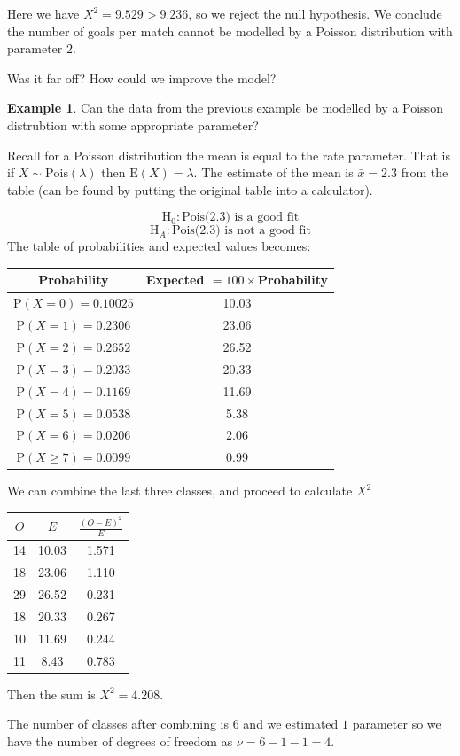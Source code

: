 \documentclass[
]{book}
\theoremstyle{definition}
\theoremstyle{definition}
\newtheorem{example}{Example}[chapter]
\theoremstyle{definition}
\theoremstyle{definition}
\theoremstyle{remark}
\begin{document}
Here we have \(X^2 = 9.529 > 9.236\), so we reject the null hypothesis. We conclude the number of goals per match cannot be modelled by a Poisson distribution with parameter \(2\).

Was it far off? How could we improve the model?

\begin{example}
Can the data from the previous example be modelled by a Poisson distrubtion with some appropriate parameter?
\end{example}

Recall for a Poisson distribution the mean is equal to the rate parameter. That is if \(X\sim \text{Pois}(\lambda)\) then \(\text{E}(X)=\lambda\). The estimate of the mean is \(\bar{x} = 2.3\) from the table (can be found by putting the original table into a calculator).

\[\text{H}_0: \text{Pois(2.3)} \text{ is a good fit}\]
\[\text{H}_A: \text{Pois(2.3)} \text{ is not a good fit}\]
The table of probabilities and expected values becomes:

\begin{longtable}[]{@{}cc@{}}
\toprule
Probability & Expected \(= 100 \times\)Probability\tabularnewline
\midrule
\endhead
\(\text{P}(X=0) = 0.10025\) & 10.03\tabularnewline
\(\text{P}(X=1) = 0.2306\) & 23.06\tabularnewline
\(\text{P}(X=2) = 0.2652\) & 26.52\tabularnewline
\(\text{P}(X=3) = 0.2033\) & 20.33\tabularnewline
\(\text{P}(X=4) = 0.1169\) & 11.69\tabularnewline
\(\text{P}(X=5) = 0.0538\) & 5.38\tabularnewline
\(\text{P}(X=6) = 0.0206\) & 2.06\tabularnewline
\(\text{P}(X\geq7) = 0.0099\) & 0.99\tabularnewline
\bottomrule
\end{longtable}

We can combine the last three classes, and proceed to calculate \(X^2\)

\begin{longtable}[]{@{}ccc@{}}
\toprule
\(O\) & \(E\) & \(\frac{(O-E)^2}{E}\)\tabularnewline
\midrule
\endhead
14 & 10.03 & 1.571\tabularnewline
18 & 23.06 & 1.110\tabularnewline
29 & 26.52 & 0.231\tabularnewline
18 & 20.33 & 0.267\tabularnewline
10 & 11.69 & 0.244\tabularnewline
11 & 8.43 & 0.783\tabularnewline
\bottomrule
\end{longtable}

Then the sum is \(X^2 = 4.208\).

The number of classes after combining is \(6\) and we estimated \(1\) parameter so we have the number of degrees of freedom as \(\nu=6-1-1 = 4\).
\end{document}
